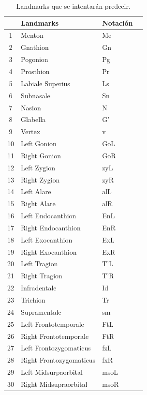     \begin{table}
        \centering
        \caption{Landmarks que se intentarán predecir.}
        \begin{tabular}{ |c|l|l|c| } 
            \hline
            & \textbf{Landmarks} & \textbf{Notación} \\
            \hline
            1 & Menton & Me \\ 
            2 & Gnathion & Gn \\ 
            3 & Pogonion & Pg \\ 
            4 & Prosthion & Pr \\ 
            5 & Labiale Superius & Ls \\ 
            6 & Subnasale & Sn \\ 
            7 & Nasion & N \\ 
            8 & Glabella & G’ \\ 
            9 & Vertex & v \\ 
            10 & Left Gonion & GoL \\ 
            11 & Right Gonion & GoR\\ 
            12 & Left Zygion & zyL \\ 
            13 & Right Zygion & zyR\\ 
            14 & Left Alare & alL \\ 
            15 & Right Alare & alR \\ 
            16 & Left Endocanthion & EnL \\ 
            17 & Right Endocanthion & EnR \\ 
            18 & Left Exocanthion & ExL \\ 
            19 & Right Exocanthion & ExR \\ 
            20 & Left Tragion & T’L \\ 
            21 & Right Tragion & T’R \\ 
            22 & Infradentale & Id \\ 
            23 & Trichion & Tr \\ 
            24 & Supramentale & sm\\ 
            25 & Left Frontotemporale & FtL \\ 
            26 & Right Frontotemporale & FtR \\ 
            27 & Left Frontozygomaticus & fzL \\ 
            28 & Right Frontozygomaticus & fxR \\ 
            29 & Left Midsurpaorbital & msoL \\ 
            30 & Right Midsupraorbital & msoR \\ 
            \hline
        \end{tabular}
        \label{table:tabla_landmarks}
    \end{table}


